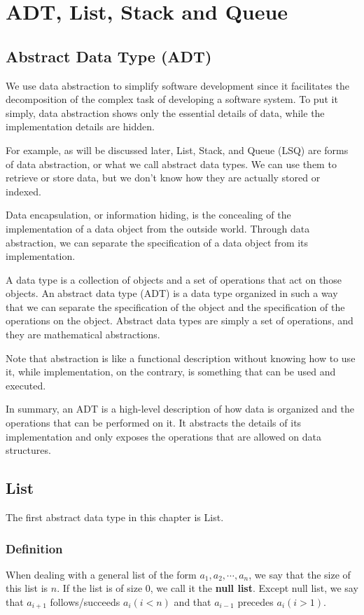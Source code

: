 \chapter{ADT, List, Stack and Queue}

\section{Abstract Data Type (ADT)}
We use data abstraction to simplify software development since it facilitates the decomposition of the complex task of developing a software system. To put it simply, data abstraction shows only the essential details of data, while the implementation details are hidden.

For example, as will be discussed later, List, Stack, and Queue (LSQ) are forms of data abstraction, or what we call abstract data types. We can use them to retrieve or store data, but we don't know how they are actually stored or indexed.

Data encapsulation, or information hiding, is the concealing of the implementation of a data object from the outside world. Through data abstraction, we can separate the specification of a data object from its implementation.

A data type is a collection of objects and a set of operations that act on those objects. An abstract data type (ADT) is a data type organized in such a way that we can separate the specification of the object and the specification of the operations on the object. Abstract data types are simply a set of operations, and they are mathematical abstractions.

Note that abstraction is like a functional description without knowing how to use it, while implementation, on the contrary, is something that can be used and executed.

In summary, an ADT is a high-level description of how data is organized and the operations that can be performed on it. It abstracts the details of its implementation and only exposes the operations that are allowed on data structures.

\section{List}
The first abstract data type in this chapter is List.

\subsection{Definition}
When dealing with a general list of the form \(a_1, a_2, \cdots, a_n\), we say that the size of this list is \(n\). If the list is of size 0, we call it the \textbf{null list}. Except null list, we say that \(a_{i+1}\) follows/succeeds \(a_i (i < n)\) and that \(a_{i-1}\) precedes \(a_i (i > 1)\). 

